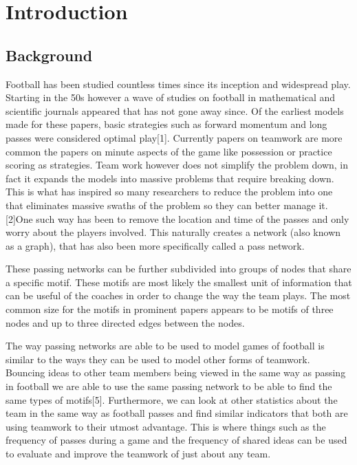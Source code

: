 \documentclass{mcmthesis}
\begin{document}
\tableofcontents

\newpage
\section{Introduction}
\subsection{Background}

Football has been studied countless times since its inception and widespread play. 
Starting in the 50s however a wave of studies on football in mathematical and scientific journals appeared that has not gone away since. 
Of the earliest models made for these papers, basic strategies such as forward momentum and long passes were considered optimal play[1]. 
Currently papers on teamwork are more common the papers on minute aspects of the game like possession or practice scoring as strategies.
Team work however does not simplify the problem down, in fact it expands the models into massive problems that require breaking down.
This is what has inspired so many researchers to reduce the problem into one that eliminates massive swaths of the problem so they can better manage it. [2]One such way has been to remove the location and time of the passes and only worry about the players involved. 
This naturally creates a network (also known as a graph), that has also been more specifically called a pass network. 

These passing networks can be further subdivided into groups of nodes that share a specific motif.
These motifs are most likely the smallest unit of information that can be useful of the coaches in order to change the way the team plays. 
The most common size for the motifs in prominent papers appears to be motifs of three nodes and up to three directed edges between the nodes. 

The way passing networks are able to be used to model games of football is similar to the ways they can be used to model other forms of teamwork.
Bouncing ideas to other team members being viewed in the same way as passing in football we are able to use the same passing network to be able to find the same types of motifs[5].
Furthermore, we can look at other statistics about the team in the same way as football passes and find similar indicators that both are using teamwork to their utmost advantage.
This is where things such as the frequency of passes during a game and the frequency of shared ideas can be used to evaluate and improve the teamwork of just about any team.
\end{document}
